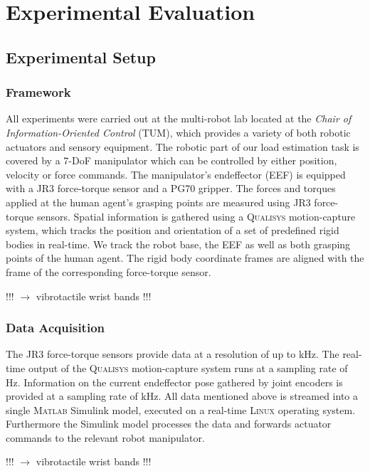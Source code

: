 \chapter{Experimental Evaluation}
\label{chap:experimental_evaluation}

\section{Experimental Setup}
\subsection{Framework}
All experiments were carried out at the multi-robot lab located at the \textit{Chair of Information-Oriented Control} (TUM), which provides a variety of both robotic actuators and sensory equipment. The robotic part of our load estimation task is covered by a 7-DoF manipulator which can be controlled by either position, velocity or force commands. The manipulator's endeffector (EEF) is equipped with a \textsc{JR3} force-torque sensor and a \textsc{PG70} gripper. The forces and torques applied at the human agent's grasping points are measured using \textsc{JR3} force-torque sensors. Spatial information is gathered using a \textsc{Qualisys} motion-capture system, which tracks the position and orientation of a set of predefined rigid bodies in real-time. We track the robot base, the EEF as well as both grasping points of the human agent. The rigid body coordinate frames are aligned with the frame of the corresponding force-torque sensor.

!!! $\longrightarrow$ vibrotactile wrist bands !!!
\subsection{Data Acquisition}
The \textsc{JR3} force-torque sensors provide data at a resolution of up to \unit[8]{kHz}. The real-time output of the \textsc{Qualisys} motion-capture system runs at a sampling rate of \unit[150]{Hz}. Information on the current endeffector pose gathered by joint encoders is provided at a sampling rate of \unit[1]{kHz}. All data mentioned above is streamed into a single \textsc{Matlab} Simulink model, executed on a real-time \textsc{Linux} operating system. Furthermore the Simulink model processes the data and forwards actuator commands to the relevant robot manipulator.

!!! $\longrightarrow$ vibrotactile wrist bands !!!

